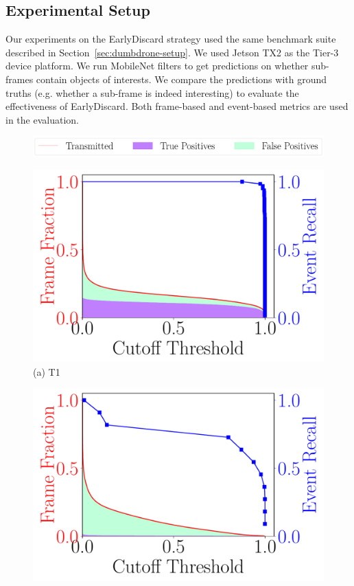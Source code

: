 \subsection{Experimental Setup}

Our experiments on the {\xc EarlyDiscard} strategy used the same benchmark suite
described in Section~\ref{sec:dumbdrone-setup}. We used Jetson TX2 as the Tier-3
device platform. We run MobileNet filters to get predictions on whether
sub-frames contain objects of interests. We compare the predictions with ground
truths (e.g. whether a sub-frame is indeed interesting) to evaluate the
effectiveness of EarlyDiscard. Both frame-based and event-based metrics are used
in the evaluation.

\begin{figure}
\centering
\includegraphics[width=\linewidth]{FIGS/fig-event-recall-frame-percentage-legend.pdf}\\
    \vspace{.5in}
\begin{minipage}[]{0.45\linewidth}
\centering
\includegraphics[width=\linewidth]{FIGS/fig-event-recall-frame-percentage-vs-threshold-okutama.pdf}\\
{(a) T1}
\end{minipage}
\begin{minipage}[]{0.45\linewidth}
\centering
    \includegraphics[width=\linewidth]{FIGS/fig-event-recall-frame-percentage-vs-threshold-stanford.pdf}\\

\end{minipage}
\end{figure}
